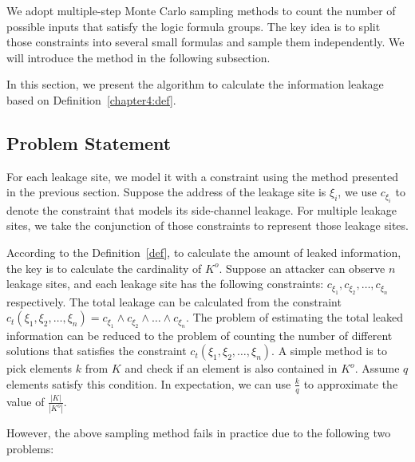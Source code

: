 We adopt multiple-step Monte Carlo sampling methods to count the number of
possible inputs that satisfy the logic formula groups. The key idea is to split
those constraints into several small formulas and sample them independently.
We will introduce the method in the following subsection.


\newcommand{\addr}[1]{{l}_{#1}}
\renewcommand{\addr}[1]{{\gamma}_{#1}}
\renewcommand{\addr}[1]{{\zeta}_{#1}}
\renewcommand{\addr}[1]{{\xi}_{#1}}

In this section, we present the algorithm to calculate the information leakage based on Definition~\ref{chapter4:def}. 

\subsection{Problem Statement}
For each leakage site, we model it with a constraint using the
method presented in the previous section. Suppose the address of the leakage site is $\addr{i}$, we use $c_{\addr{i}}$ to denote the constraint that models its side-channel leakage. For multiple leakage sites, we take the conjunction of those constraints to represent those leakage sites.

According to the Definition~\ref{def}, to calculate the amount of leaked
information, the key is to calculate the cardinality
of $K^o$. Suppose an attacker can observe $n$ leakage sites, and each leakage
site has the following constraints: $c_{\addr{1}}, c_{\addr{2}}, \ldots,
    c_{\addr{n}}$ respectively. The total leakage can be calculated from the constraint
$c_t({\addr{1}},{\addr{2}},\ldots,{\addr{n}}) = c_{\addr{1}} \land c_{\addr{2}}
    \land \ldots \land c_{\addr{n}}$.
The problem of estimating the total leaked
information can be reduced to the problem of counting the number of different
solutions that satisfies the constraint
$c_t({\addr{1}},{\addr{2}},\ldots,{\addr{n}})$.
A simple method is to pick elements $k$ from $K$ and check if an
element is also contained in $K^o$. Assume $q$ elements satisfy this condition. In
expectation, we can use $\frac{k}{q}$ to approximate the value of
$\frac{|K|}{|K^o|}$.

However, the above sampling method fails in practice due to the following two problems:

